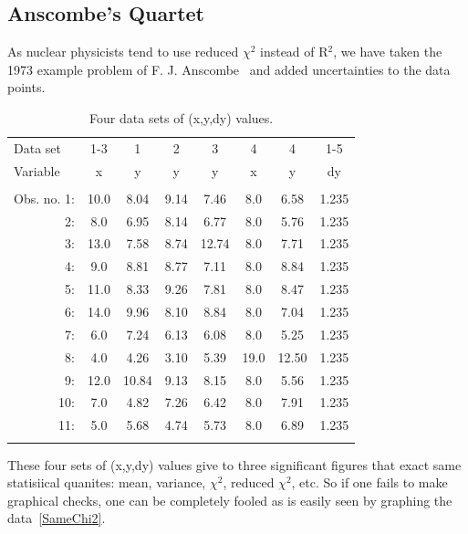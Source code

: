 \documentclass[10pt,aps,prc,twocolumn]{revtex4-1}
\begin{document}
\begin{appendix}
\section{Anscombe's Quartet}

As nuclear physicists tend to use reduced $\chi^2$ instead of R$^2$, we have taken the 1973 example
problem of F. J. Anscombe~\cite{Anscombe:1973} and added uncertainties to the data points.

\begin{table}[htb]
\caption{Four data sets of (x,y,dy) values.}
\begin{tabular}{rccccccc}
\multicolumn{1}{l}{Data set}    & 1-3  & 1    & 2    & 3    & 4   & 4    & 1-5   \\
\multicolumn{1}{l}{Variable}    & x    & y    & y    & y    & x   & y    & dy    \\  
            &      &      &      &      &     &      &       \\
Obs. no. 1: & 10.0 & 8.04 & 9.14 & 7.46 & 8.0 & 6.58 & 1.235 \\ 
         2:   &  8.0 & 6.95 & 8.14 & 6.77 & 8.0 & 5.76 & 1.235 \\
         3:   & 13.0 & 7.58 & 8.74 &12.74 & 8.0 & 7.71 & 1.235 \\
         4:   &  9.0 & 8.81 & 8.77 & 7.11 & 8.0 & 8.84 & 1.235 \\
         5:   & 11.0 & 8.33 & 9.26 & 7.81 & 8.0 & 8.47 & 1.235 \\
         6:   & 14.0 & 9.96 & 8.10 & 8.84 & 8.0 & 7.04 & 1.235 \\
         7:   &  6.0 & 7.24 & 6.13 & 6.08 & 8.0 & 5.25 & 1.235 \\
         8:   &  4.0 & 4.26 & 3.10 & 5.39 &19.0 &12.50 & 1.235 \\
         9:   & 12.0 &10.84 & 9.13 & 8.15 & 8.0 & 5.56 & 1.235 \\
       10:    &  7.0 & 4.82 & 7.26 & 6.42 & 8.0 & 7.91 & 1.235 \\
       11:    &  5.0 & 5.68 & 4.74 & 5.73 & 8.0 & 6.89 & 1.235 \\ 
            &      &      &      &      &     &      &       \\ \hline
\end{tabular}
\end{table}

These four sets of (x,y,dy) values give to three significant figures that exact
same statisiical quanites: mean, variance, $\chi^2$, reduced $\chi^2$, etc.
So if one fails to make graphical checks, one can be completely fooled as is 
easily seen by graphing the data~\ref{SameChi2}.


\end{appendix}
\end{document}
